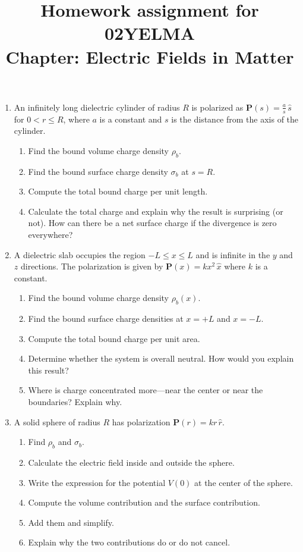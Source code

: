 \documentclass[12pt]{article}
\title{Homework assignment for 02YELMA \\ Chapter: Electric Fields in Matter}
\begin{document}
\date{}
\maketitle
\vspace{-0.8in}

\begin{enumerate}
    
    \item An infinitely long dielectric cylinder of radius $R$ is polarized as $\mathbf{P}(s) = \frac{a}{s}\,\hat{s}$ for $0 < r \le R$, where $a$ is a constant and $s$ is the distance from the axis of the cylinder.

    \begin{enumerate}
        \item Find the bound volume charge density $\rho_b$.
        \item Find the bound surface charge density $\sigma_b$ at $s = R$.
        \item Compute the total bound charge per unit length.
        \item Calculate the total charge and explain why the result is surprising (or not). How can there be a net surface charge if the divergence is zero everywhere?
    \end{enumerate}

    \item A dielectric slab occupies the region $- L \le x \le L$ and is infinite in the $y$ and $z$ directions. The polarization is given by $\mathbf{P}(x) = k x^2 \,\hat{x}$ where $k$ is a constant.

    \begin{enumerate}
        \item Find the bound volume charge density $\rho_b(x)$.
        \item Find the bound surface charge densities at $x = +L$ and $x = -L$.
        \item Compute the total bound charge per unit area.
        \item Determine whether the system is overall neutral. How would you explain this result?
        \item Where is charge concentrated more---near the center or near the boundaries? Explain why.
    \end{enumerate}

    \item A solid sphere of radius $R$ has polarization $\mathbf{P}(r) = k r \,\hat{r}$. 
    \begin{enumerate}
        \item Find $\rho_b$ and $\sigma_b$.
        \item Calculate the electric field inside and outside the sphere. 
        \item Write the expression for the potential $V(0)$ at the center of the sphere.
        \item Compute the volume contribution and the surface contribution. 
        \item Add them and simplify.
        \item Explain why the two contributions do or do not cancel.
    \end{enumerate}

\end{enumerate}
\end{document}
